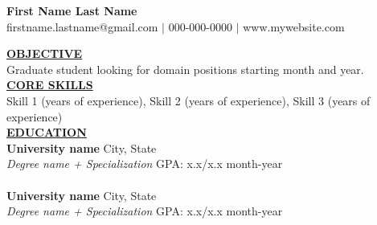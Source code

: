 \documentclass{article}
\begin{document}
\begin{center}
\thispagestyle{empty}
\large \textbf{First Name Last Name \\}
\normalsize firstname.lastname@gmail.com $\mid$ 000-000-0000 $\mid$ www.mywebsite.com    \\
\hrulefill
\end{center}


\noindent \textbf{\underline{OBJECTIVE}} \\
\noindent Graduate student looking for domain positions starting month and year. \\


\noindent \textbf{\underline{CORE SKILLS}} \\
Skill 1 (years of experience), Skill 2 (years of experience), Skill 3 (years of experience) \\

\noindent \textbf{\underline{EDUCATION}} \\
\textbf{University name} \hfill City, State \\
\textit{Degree name + Specialization} \hfill GPA: x.x/x.x \hfill month-year \\ \\
\textbf{University name} \hfill City, State \\
\textit{Degree name + Specialization} \hfill GPA: x.x/x.x \hfill month-year \\
\end{document}
